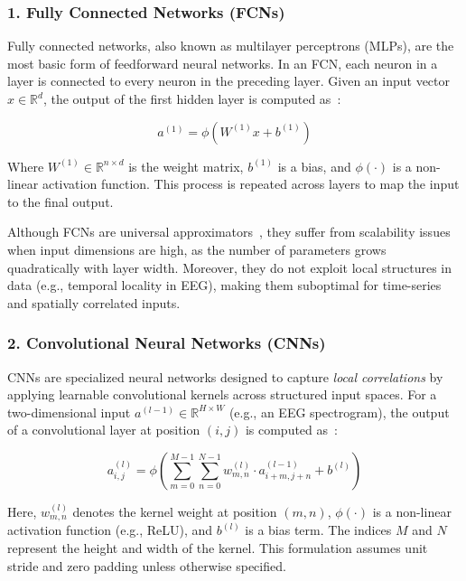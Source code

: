 \subsubsection{1. Fully Connected Networks (FCNs)}
Fully connected networks, also known as multilayer perceptrons (MLPs), are the most basic form of feedforward neural networks. In an FCN, each neuron in a layer is connected to every neuron in the preceding layer. Given an input vector $x \in \mathbb{R}^d$, the output of the first hidden layer is computed as~\cite{dl}:

\begin{equation}
a^{(1)} = \phi(W^{(1)}x + b^{(1)})
\end{equation}

Where $W^{(1)} \in \mathbb{R}^{n \times d}$ is the weight matrix, $b^{(1)}$ is a bias, and $\phi(\cdot)$ is a non-linear activation function. This process is repeated across layers to map the input to the final output.

Although FCNs are universal approximators~\cite{hornik1989multilayer}, they suffer from scalability issues when input dimensions are high, as the number of parameters grows quadratically with layer width. Moreover, they do not exploit local structures in data (e.g., temporal locality in EEG), making them suboptimal for time-series and spatially correlated inputs.

\subsubsection{2. Convolutional Neural Networks (CNNs)}
CNNs are specialized neural networks designed to capture \textit{local correlations} by applying learnable convolutional kernels across structured input spaces. For a two-dimensional input \( a^{(l-1)} \in \mathbb{R}^{H \times W} \) (e.g., an EEG spectrogram), the output of a convolutional layer at position \( (i, j) \) is computed as~\cite{dl}:

\begin{equation}
a_{i,j}^{(l)} = \phi \left( \sum_{m=0}^{M-1} \sum_{n=0}^{N-1} w_{m,n}^{(l)} \cdot a_{i+m,j+n}^{(l-1)} + b^{(l)} \right)
\label{eq:conv2d}
\end{equation}

Here, \( w_{m,n}^{(l)} \) denotes the kernel weight at position \( (m,n) \), \( \phi(\cdot) \) is a non-linear activation function (e.g., ReLU), and \( b^{(l)} \) is a bias term. The indices \( M \) and \( N \) represent the height and width of the kernel. This formulation assumes unit stride and zero padding unless otherwise specified.

